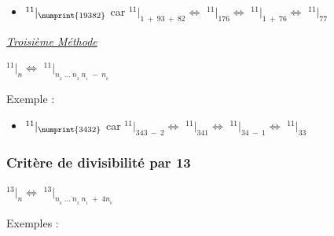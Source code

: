\documentclass[a4paper]{article}
\begin{document}
\begin{Large}
\begin{itemize}

	\item[] $ ^{11}|_{\numprint{19382}}$ {\normalsize car} $^{11}|_{1~+~93~+~82} \Leftrightarrow$ $^{11}|_{176} \Leftrightarrow$ $^{11}|_{1~+~76} \Leftrightarrow$ $^{11}|_{77} $\\

\end{itemize}
\end{Large}

\smallskip



{\noindent \underline{\textit{Troisième Méthode}}}

\begin{center}
	\huge
	$ ^{11}|_n \Leftrightarrow$ $^{11}|_{\overline{n_{_{k}}~\dots~n_{_2}~n_{_1}}~-~n_{_0}} $
\end{center}

{ \parindent=0.5cm Exemple : }

\begin{Large}
\begin{itemize}

	\item[] $ ^{11}|_{\numprint{3432}}$ {\normalsize car} $^{11}|_{343~-~2} \Leftrightarrow$ $^{11}|_{341} \Leftrightarrow$ $^{11}|_{34~-~1} \Leftrightarrow$ $^{11}|_{33} $\\

\end{itemize}
\end{Large}

\let\thefootnote\relax{}


\vspace{4 mm}
{\noindent \dotfill}


\subsubsection*{Critère de divisibilité par 13}

\begin{center}
	\huge
	$ ^{13}|_n \Leftrightarrow$ $^{13}|_{\overline{n_{_{k}}~\dots~n_{_2}~n_{_1}}~+~4n_{_0}} $
\end{center}

{ \parindent=0.5cm Exemples : }
\end{document}
